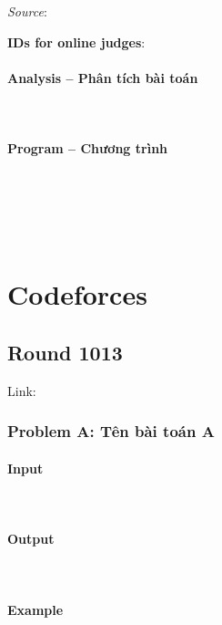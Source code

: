 \documentclass{article}
\begin{document}
\textit{Source}: 

\textbf{IDs for online judges}:

\paragraph{Analysis -- Phân tích bài toán} \mbox{} \\



\paragraph{Program -- Chương trình} \mbox{} \\


\begin{lstlisting}
	
	
\end{lstlisting}


\section{Codeforces}

\subsection{Round 1013}

Link: \url{}

\subsubsection{Problem A: Tên bài toán A}

\paragraph{Input} \mbox{} \\



\paragraph{Output}\mbox{} \\


\paragraph{Example}\mbox{} \\
\end{document}
